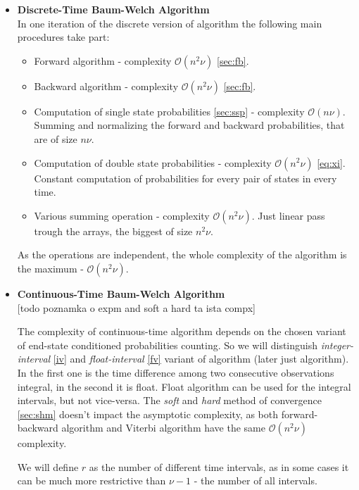 \documentclass[thesis=M,english]{FITthesis}[2012/10/20]
\begin{document}
\begin{itemize}\label{it:dtc}
\item \textbf{ Discrete-Time Baum-Welch Algorithm } \\
In one iteration of the discrete version of algorithm the following main procedures take part:
\begin{itemize}
\item Forward algorithm - complexity $\mathcal{O}(n^2\nu)$ \ref{sec:fb}.
\item Backward algorithm - complexity $\mathcal{O}(n^2\nu)$ \ref{sec:fb}.
\item Computation of single state probabilities \ref{sec:ssp} - complexity $\mathcal{O}(n\nu)$. Summing and normalizing the forward and backward probabilities, that are of size $n\nu$.
\item Computation of double state probabilities - complexity $\mathcal{O}(n^2\nu)$ \eqref{eq:xi}. Constant computation of probabilities for every pair of states in every time.
\item Various summing operation - complexity $\mathcal{O}(n^2\nu)$. Just linear pass trough the arrays, the biggest of size $n^2\nu$.
\end{itemize}

As the operations are independent, the whole complexity of the algorithm is the maximum -  $\mathcal{O}(n^2\nu)$.

\item \textbf{ Continuous-Time Baum-Welch Algorithm } \\

[todo poznamka o expm and soft a hard ta ista compx]

The complexity of continuous-time algorithm depends on the chosen variant of end-state conditioned probabilities counting. So we will distinguish \textit{integer-interval} \ref{iv} and \textit{float-interval} \ref{fv} variant of algorithm (later just algorithm). In the first one is the time difference among two consecutive observations integral, in the second it is float. Float algorithm can be used for the integral intervals, but not vice-versa. The \textit{soft} and \textit{hard} method of convergence \ref{sec:shm} doesn't impact the asymptotic complexity, as both forward-backward algorithm and Viterbi algorithm 
have the same $\mathcal{O}(n^2 \nu)$ complexity.

We will define $r$ as the number of different time intervals, as in some cases it can be much more restrictive than $\nu - 1$ - the number of all intervals.


\end{itemize}
\end{document}
